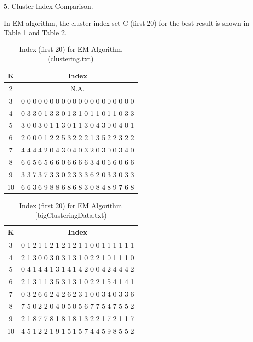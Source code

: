 \begin{description}
\begin{description}
\item{5.} Cluster Index Comparison.

In EM algorithm, the cluster index set C (first 20) for the best result is shown in Table \ref{table:index_EM_clustering} and Table \ref{table:index_EM_bigClustering}.

\begin{table}[H]
	\centering
	\caption{Index (first 20) for EM Algorithm (clustering.txt)}
	\label{table:index_EM_clustering}	
	\begin{tabular}{ c | c }
		\hline \hline
		K        &    Index  \\[0.1cm]
		\hline
		2      & N.A. \\[0.1cm]
		3     &  0 0 0 0 0 0 0 0 0 0 0 0 0 0 0 0 0 0 0 0 \\[0.1cm]
		4     &  0 3 3 0 1 3 3 0 1 3 1 0 1 1 0 1 1 0 3 3 \\[0.1cm]
		5     &  3 0 0 3 0 1 1 3 0 1 1 3 0 4 3 0 0 4 0 1 \\[0.1cm]
		6     &  2 0 0 0 1 2 2 5 3 2 2 2 1 3 5 2 2 3 2 2 \\[0.1cm]
		7     &  4 4 4 4 2 0 4 3 0 4 0 3 2 0 3 0 0 3 4 0 \\[0.1cm]
		8     &  6 6 5 6 5 6 6 0 6 6 6 6 3 4 0 6 6 0 6 6 \\[0.1cm]
		9     &  3 3 7 3 7 3 3 0 2 3 3 3 6 2 0 3 3 0 3 3 \\[0.1cm]
		10   &  6 6 3 6 9 8 8 6 8 6 8 3 0 8 4 8 9 7 6 8 \\[0.1cm]
		\hline	
	\end{tabular}
\end{table}

\begin{table}[H]
	\centering
	\caption{Index (first 20) for EM Algorithm (bigClusteringData.txt)}
	\label{table:index_EM_bigClustering}	
	\begin{tabular}{ c | c }
		\hline \hline
		K    & Index \\[0.1cm]
		\hline
		3     &  0 1 2 1 1 2 1 2 1 2 1 1 0 0 1 1 1 1 1 1 \\[0.1cm]
		4     &  2 1 3 0 0 3 0 3 1 3 1 0 2 2 1 0 1 1 1 0 \\[0.1cm]
		5     &  0 4 1 4 4 1 3 1 4 1 4 2 0 0 4 2 4 4 4 2 \\[0.1cm]
		6     &  2 1 3 1 1 3 5 3 1 3 1 0 2 2 1 5 4 1 4 1 \\[0.1cm]
		7     &  0 3 2 6 6 2 4 2 6 2 3 1 0 0 3 4 0 3 3 6 \\[0.1cm]
		8     &  7 5 0 2 2 0 4 0 5 0 5 6 7 7 5 4 7 5 5 2 \\[0.1cm]
		9     &  2 1 8 7 7 8 1 8 1 8 1 3 2 2 1 7 2 1 1 7 \\[0.1cm]
		10   &  4 5 1 2 2 1 9 1 5 1 5 7 4 4 5 9 8 5 5 2 \\[0.1cm]
		\hline	
	\end{tabular}
\end{table}
\end{description}

\end{description}

